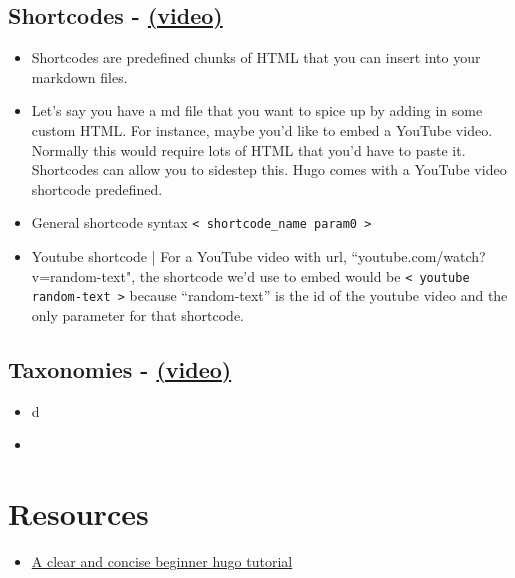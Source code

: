 \subsection{Shortcodes - \href{https://youtu.be/2xkNJL4gJ9E?list=PLLAZ4kZ9dFpOnyRlyS-liKL5ReHDcj4G3 }{(video)} }
\begin{itemize}
\item
	Shortcodes are predefined chunks of HTML that you can insert into your markdown files.
\item
	Let's say you have a md file that you want to spice up by adding in some custom HTML. For instance, maybe you'd like to embed a YouTube video. Normally this would require lots of HTML that you'd have to paste it. Shortcodes can allow you to sidestep this. Hugo comes with a YouTube video shortcode predefined.
\item
	 General shortcode syntax \texttt{{{< shortcode\_name param0 >}}}
\item
	Youtube shortcode | For a YouTube video with url, ``youtube.com/watch?v=random-text", the shortcode we'd use to embed would be \texttt{{{< youtube random-text >}}} because ``random-text'' is the id of the youtube video and the only parameter for that shortcode.
\end{itemize}

\subsection{Taxonomies - \href{https://youtu.be/pCPCQgqC8RA?list=PLLAZ4kZ9dFpOnyRlyS-liKL5ReHDcj4G3 }{(video)}}
\begin{itemize}
\item
	d
\item

\end{itemize}


\section{Resources}
\begin{itemize}
\item
	\href{https://www.linkedin.com/learning/learning-static-site-building-with-hugo-2/build-a-static-site-with-hugo?resume=false}{A clear and concise beginner hugo tutorial}
\end{itemize}

